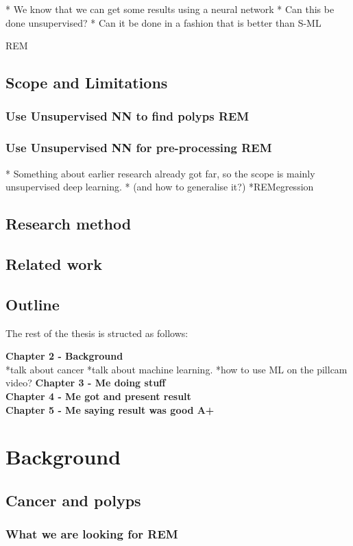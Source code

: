 \documentclass[a4paper,english]{ifimaster}
\begin{document}
		* We know that we can get some results using a neural network
		* Can this be done unsupervised?
		* Can it be done in a fashion that is better than S-ML
		 
		 REM

		
	\section{Scope and Limitations}
		\subsection{Use Unsupervised NN to find polyps REM}
		\subsection{Use Unsupervised NN for pre-processing REM}
		* Something about earlier research already got far, so the scope is mainly unsupervised deep learning.
		* (and how to generalise it?)
*REMegression	
		

	\section{Research method}
	\section{Related work}
	\section{Outline}
	The rest of the thesis is structed as follows:
	
	\textbf{Chapter 2 - Background}\\
	*talk about cancer
	*talk about machine learning.
	*how to use ML on the pillcam video?
	\textbf{Chapter 3 - Me doing stuff}\\
	\textbf{Chapter 4 - Me got and present result}\\
	\textbf{Chapter 5 - Me saying result was good A+}\\
	
	
\chapter{Background}
	\section{Cancer and polyps}
	  \subsection{What we are looking for REM}
	  
\end{document}
